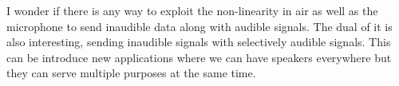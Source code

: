 \documentclass[a4paper]{article}
\begin{document}
 I wonder if there is any way to exploit the non-linearity in air as well as the microphone to send inaudible data along with audible signals. The dual of it is also interesting, sending inaudible signals with selectively audible signals. This can be introduce new applications where we can have speakers everywhere but they can serve multiple purposes at the same time. 







 
\end{document}

